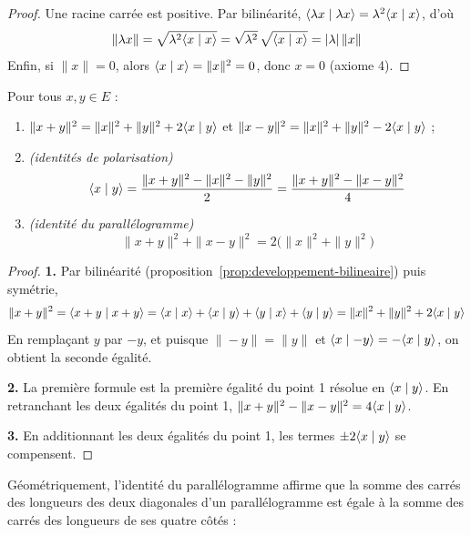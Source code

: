 \begin{proof}
Une racine carrée est positive. Par bilinéarité, $\langle \lambda x\mid \lambda x\rangle=\lambda^2\langle x\mid x\rangle$, d'où
\[\|\lambda x\|=\sqrt{\lambda^2\langle x\mid x\rangle}=\sqrt{\lambda^2}\,\sqrt{\langle x\mid x\rangle}=|\lambda|\,\|x\|\]
Enfin, si $\|x\|=0$, alors $\langle x\mid x\rangle=\|x\|^2=0$, donc $x=0$ (axiome 4).
\end{proof}

\begin{prop}
\label{prop:identites-remarquables}
Pour tous $x,y\in E$ :
\begin{enumerate}
\item $\|x+y\|^2=\|x\|^2+\|y\|^2+2\langle x\mid y\rangle$ et $\|x-y\|^2=\|x\|^2+\|y\|^2-2\langle x\mid y\rangle$ ;
\item \emph{(identités de polarisation)}
\[\langle x\mid y\rangle=\frac{\|x+y\|^2-\|x\|^2-\|y\|^2}{2}=\frac{\|x+y\|^2-\|x-y\|^2}{4}\]
\item \emph{(identité du parallélogramme)}
\[\|x+y\|^2+\|x-y\|^2=2\big(\|x\|^2+\|y\|^2\big)\]
\end{enumerate}
\end{prop}

\begin{proof}
\textbf{1.} Par bilinéarité (proposition~\ref{prop:developpement-bilineaire}) puis symétrie,
\[\|x+y\|^2=\langle x+y\mid x+y\rangle=\langle x\mid x\rangle+\langle x\mid y\rangle+\langle y\mid x\rangle+\langle y\mid y\rangle=\|x\|^2+\|y\|^2+2\langle x\mid y\rangle\]
En remplaçant $y$ par $-y$, et puisque $\|-y\|=\|y\|$ et $\langle x\mid -y\rangle=-\langle x\mid y\rangle$, on obtient la seconde égalité.

\textbf{2.} La première formule est la première égalité du point 1 résolue en $\langle x\mid y\rangle$. En retranchant les deux égalités du point 1, $\|x+y\|^2-\|x-y\|^2=4\langle x\mid y\rangle$.

\textbf{3.} En additionnant les deux égalités du point 1, les termes $\pm2\langle x\mid y\rangle$ se compensent.
\end{proof}

Géométriquement, l'identité du parallélogramme affirme que la somme des carrés des longueurs des deux diagonales d'un parallélogramme est égale à la somme des carrés des longueurs de ses quatre côtés :
\begin{center}
\end{center}

